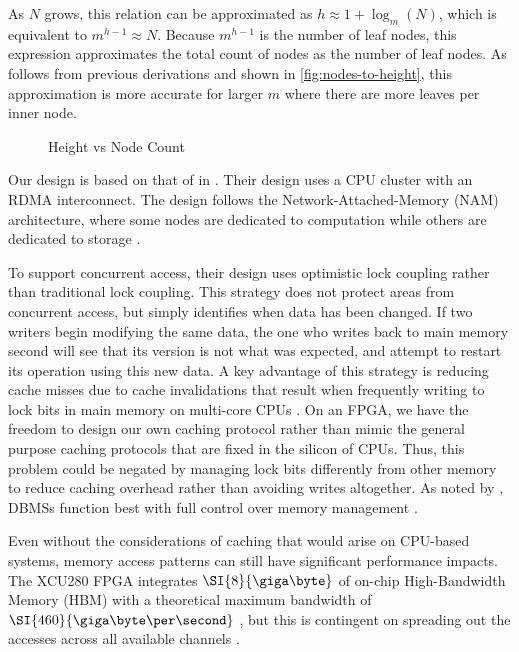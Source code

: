 As $N$ grows, this relation can be approximated as $h \approx 1 + \log_m(N)$,
which is equivalent to  $m^{h-1} \approx N$. Because $m^{h-1}$ is the number of
leaf nodes, this expression approximates the total count of nodes as the number
of leaf nodes. As follows from previous derivations and shown in
\autoref{fig:nodes-to-height}, this approximation is more accurate for larger $m$
where there are more leaves per inner node.

\begin{figure}
	\centering
	
	\caption{Height vs Node Count}
	\label{fig:nodes-to-height}
\end{figure}



Our design is based on that of \citeauthor{base} in . Their
design uses a CPU cluster with an RDMA interconnect. The design follows the
Network-Attached-Memory (NAM) architecture, where some nodes are dedicated to
computation while others are dedicated to storage
\autocite{base,binnig-vldb-2016}.

To support concurrent access, their design uses optimistic lock coupling rather
than traditional lock coupling. This strategy does not protect areas from
concurrent access, but simply identifies when data has been changed. If two
writers begin modifying the same data, the one who writes back to main memory
second will see that its version is not what was expected, and attempt to
restart its operation using this new data. A key advantage of this strategy is
reducing cache misses due to cache invalidations that result when frequently
writing to lock bits in main memory on multi-core CPUs
\autocite{leis-damon-2016}. On an FPGA, we have the freedom to design our own
caching protocol rather than mimic the general purpose caching protocols that
are fixed in the silicon of CPUs. Thus, this problem could be negated by
managing lock bits differently from other memory to reduce caching overhead
rather than avoiding writes altogether. As noted by
\citeauthor{binnig-vldb-2016}, DBMSs function best with full control over memory
management \autocite{binnig-vldb-2016}.



Even without the considerations of caching that would arise on CPU-based
systems, memory access patterns can still have significant performance impacts.
The XCU280 FPGA integrates $\SI{8}{\giga\byte}$ of on-chip High-Bandwidth Memory
(HBM) with a theoretical maximum bandwidth of $\SI{460}{\giga\byte\per\second}$
\autocite{u280}, but this is contingent on spreading out the accesses across all
available channels \autocite{holzinger-ipdpsw-2021}.

